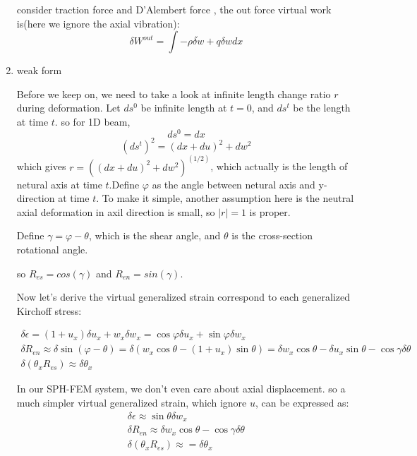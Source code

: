 \documentclass[11pt]{article}
\begin{document}
\begin{enumerate}
consider traction force and D'Alembert force , the out force virtual work is(here we ignore the axial vibration):
$$ \delta W^{out} = \int -\rho \ddot{\delta w} + q \delta w dx $$


\item{weak form}

Before we keep on, we need to take a look at infinite length change ratio $r$ during deformation. Let $ds^0$ be infinite length at $t=0$, and $ds^t$ be the length at time $t$. so for 1D beam,
	$$ ds^0 = dx $$
	$$ (ds^t)^2 = (dx + du)^2 + dw^2 $$
which gives $r = ((dx + du)^2 + dw^2)^(1/2)$, which actually is the length of netural axis at time $t$.Define $\varphi$ as the angle between netural axis and y-direction at time $t$. To make it simple, another assumption here is the neutral axial deformation in axil direction is small, so $|r|=1$ is proper.

Define $\gamma = \varphi - \theta$, which is the shear angle, and $\theta$ is the cross-section rotational angle.

so $R_{es} = cos(\gamma)$ and $R_{en} = sin(\gamma)$. 

Now let's derive the virtual generalized strain correspond to each generalized Kirchoff stress:

\begin{subequations}
\begin{align}
  \delta \epsilon = (1+ u_x) \delta u_x + w_x \delta w_x = \cos \varphi \delta u_x + \sin \varphi \delta w_x \\
 \delta R_{en} \approx \delta \sin(\varphi - \theta) = \delta (w_x \cos \theta - (1+u_x) \sin \theta) = \delta w_x \cos \theta - \delta u_x \sin \theta - \cos \gamma \delta \theta \\ 
  \delta (\theta _x R_{es}) \approx  \delta \theta_x 
\end{align}
\end{subequations}


In our SPH-FEM system, we don't even care about axial displacement. so a much simpler virtual generalized strain, which ignore $u$, can be expressed as:
\begin{subequations}
\begin{align}
  \delta \epsilon \approx \sin \theta \delta w_x \\
 \delta R_{en} \approx \delta w_x \cos \theta - \cos \gamma \delta \theta \\ 
 \delta (\theta_x R_{es}) \approx = \delta \theta_x 
\end{align}
\end{subequations}


\end{enumerate}
\end{document}
